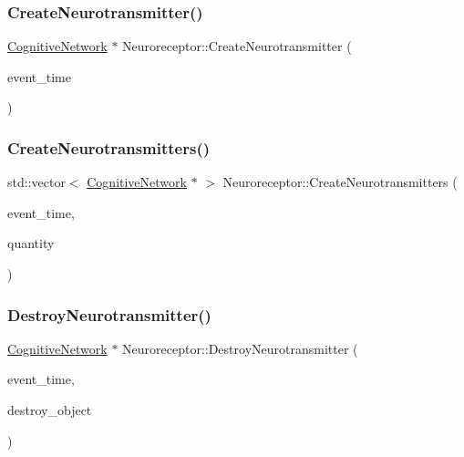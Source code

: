 \subsubsection{\texorpdfstring{Create\+Neurotransmitter()}{CreateNeurotransmitter()}}
{\footnotesize\ttfamily \mbox{\hyperlink{classCognitiveNetwork}{Cognitive\+Network}} $\ast$ Neuroreceptor\+::\+Create\+Neurotransmitter (\begin{DoxyParamCaption}\item[{std\+::chrono\+::time\+\_\+point$<$ \mbox{\hyperlink{universe_8h_a0ef8d951d1ca5ab3cfaf7ab4c7a6fd80}{Clock}} $>$}]{event\+\_\+time }\end{DoxyParamCaption})}

\mbox{\label{classNeuroreceptor_aa0037379ecb214ff982429e054f2a194}} 
\subsubsection{\texorpdfstring{Create\+Neurotransmitters()}{CreateNeurotransmitters()}}
{\footnotesize\ttfamily std\+::vector$<$ \mbox{\hyperlink{classCognitiveNetwork}{Cognitive\+Network}} $\ast$ $>$ Neuroreceptor\+::\+Create\+Neurotransmitters (\begin{DoxyParamCaption}\item[{std\+::chrono\+::time\+\_\+point$<$ \mbox{\hyperlink{universe_8h_a0ef8d951d1ca5ab3cfaf7ab4c7a6fd80}{Clock}} $>$}]{event\+\_\+time,  }\item[{int}]{quantity }\end{DoxyParamCaption})}

\mbox{\label{classNeuroreceptor_a35beb8e355f9b567b327e9323f5552a0}} 
\subsubsection{\texorpdfstring{Destroy\+Neurotransmitter()}{DestroyNeurotransmitter()}}
{\footnotesize\ttfamily \mbox{\hyperlink{classCognitiveNetwork}{Cognitive\+Network}} $\ast$ Neuroreceptor\+::\+Destroy\+Neurotransmitter (\begin{DoxyParamCaption}\item[{std\+::chrono\+::time\+\_\+point$<$ \mbox{\hyperlink{universe_8h_a0ef8d951d1ca5ab3cfaf7ab4c7a6fd80}{Clock}} $>$}]{event\+\_\+time,  }\item[{\mbox{\hyperlink{classCognitiveNetwork}{Cognitive\+Network}} $\ast$}]{destroy\+\_\+object }\end{DoxyParamCaption})}

